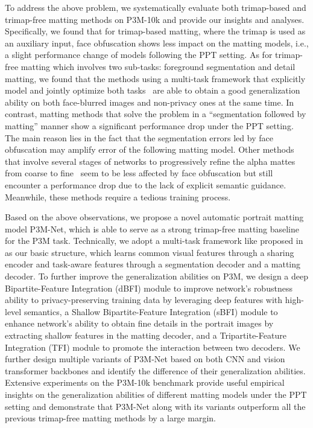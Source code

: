 \documentclass[twocolumn]{svjour3}
\begin{document}
To address the above problem, we systematically evaluate both trimap-based \citep{dim,lu2019indices,li2020natural} and trimap-free matting methods \citep{shm,lf,modnet} on P3M-10k and provide our insights and analyses. Specifically, we found that for trimap-based matting, where the trimap is used as an auxiliary input, face obfuscation shows less impact on the matting models, i.e., a slight performance change of models following the PPT setting. As for trimap-free matting which involves two sub-tasks: foreground segmentation and detail matting, we found that the methods using a multi-task framework that explicitly model and jointly optimize both tasks~\citep{gfm,hatt} are able to obtain a good generalization ability on both face-blurred images and non-privacy ones at the same time. In contrast, matting methods that solve the problem in a  ``segmentation followed by matting'' manner \citep{shm,dapm} show a significant performance drop under the PPT setting. The main reason lies in the fact that  the segmentation errors led by face obfuscation may amplify error of the following matting model. Other methods that involve several stages of networks to progressively refine the alpha mattes from coarse to fine~\citep{shmc} seem to be less affected by face obfuscation but still encounter a performance drop due to the lack of explicit semantic guidance. Meanwhile, these methods require a tedious training process.

Based on the above observations, we propose a novel automatic portrait matting model P3M-Net, which is able to serve as a strong trimap-free matting baseline for the P3M task. Technically, we adopt a multi-task framework like proposed in~\citep{gfm, modnet} as our basic structure, which learns common visual features through a sharing encoder and task-aware features through a segmentation decoder and a matting decoder. To further improve the generalization abilities on P3M, we design a deep Bipartite-Feature Integration (dBFI) module to improve network's robustness ability to privacy-preserving training data by leveraging deep features with high-level semantics, a Shallow Bipartite-Feature Integration (sBFI) module to enhance network's ability to obtain fine details in the portrait images by extracting shallow features in the matting decoder, and a Tripartite-Feature Integration (TFI) module to promote the interaction between two decoders. We further design multiple variants of P3M-Net based on both CNN and vision transformer backbones and identify the difference of their generalization abilities. Extensive experiments on the P3M-10k benchmark provide useful empirical insights on the generalization abilities of different matting models under the PPT setting and demonstrate that P3M-Net along with its variants outperform all the previous trimap-free matting methods by a large margin.
\end{document}

